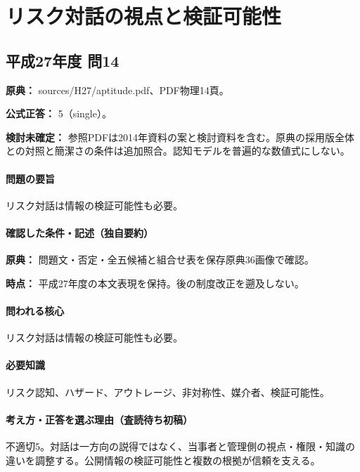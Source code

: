 \section{リスク対話の視点と検証可能性}

\subsection{平成27年度 問14}
\label{q:h27-reg-apt-14}

\noindent\textbf{原典：} sources/H27/aptitude.pdf、PDF物理14頁。

\textbf{公式正答：} 5（single）。

\par\textbf{検討未確定：} 参照PDFは2014年資料の案と検討資料を含む。原典の採用版全体との対照と簡潔さの条件は追加照合。認知モデルを普遍的な数値式にしない。

\paragraph{問題の要旨} リスク対話は情報の検証可能性も必要。

\paragraph{確認した条件・記述（独自要約）}\mbox{}\par

\noindent\textbf{原典：} 問題文・否定・全五候補と組合せ表を保存原典36画像で確認。\par

\noindent\textbf{時点：} 平成27年度の本文表現を保持。後の制度改正を遡及しない。\par

\paragraph{問われる核心} リスク対話は情報の検証可能性も必要。

\paragraph{必要知識} リスク認知、ハザード、アウトレージ、非対称性、媒介者、検証可能性。

\paragraph{考え方・正答を選ぶ理由（査読待ち初稿）} 不適切5。対話は一方向の説得ではなく、当事者と管理側の視点・権限・知識の違いを調整する。公開情報の検証可能性と複数の根拠が信頼を支える。

